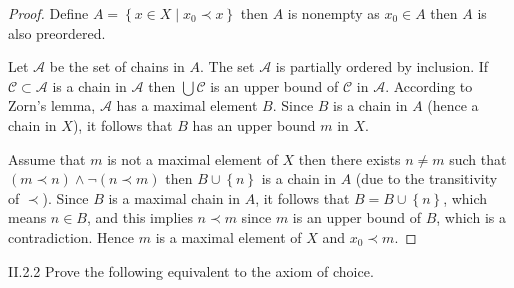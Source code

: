 \begin{proof}
	Define \( A = \left\{ x \in X \mid x_{0} \prec x \right\} \) then \( A \) is nonempty as \( x_{0} \in A \) then \( A \) is also preordered.

	Let \( \mathscr{A} \) be the set of chains in \( A \). The set \( \mathscr{A} \) is partially ordered by inclusion. If \( \mathscr{C} \subset \mathscr{A} \) is a chain in \( \mathscr{A} \) then \( \bigcup \mathscr{C} \) is an upper bound of \( \mathscr{C} \) in \( \mathscr{A} \). According to Zorn's lemma, \( \mathscr{A} \) has a maximal element \( B \). Since \( B \) is a chain in \( A \) (hence a chain in \(X\)), it follows that \( B \) has an upper bound \( m \) in \( X \).

	Assume that \(m\) is not a maximal element of \(X\) then there exists \( n \ne m \) such that \( (m \prec n) \land \neg (n \prec m) \) then \( B \cup \left\{ n \right\} \) is a chain in \( A \) (due to the transitivity of \(\prec\)). Since \( B \) is a maximal chain in \(A\), it follows that \( B = B \cup \left\{ n \right\} \), which means \( n \in B \), and this implies \( n \prec m \) since \(m\) is an upper bound of \(B\), which is a contradiction. Hence \(m\) is a maximal element of \(X\) and \( x_{0} \prec m \).
\end{proof}

\begin{problem}{II.2.2}\label{problem:II.2.2}
Prove the following equivalent to the axiom of choice.
\end{problem}


